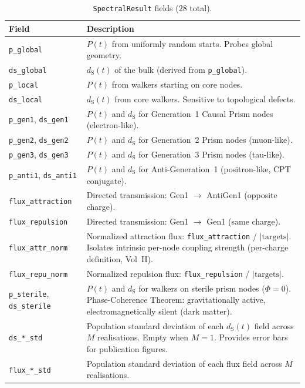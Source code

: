 \documentclass[11pt, a4paper, openany]{book}
\newcommand{\dS}{d_{\mathrm{S}}}
\newcommand{\code}[1]{\texttt{#1}}
\begin{document}
\begin{table}[H]
\centering
\begin{tabular}{@{} l p{9cm} @{}}
\toprule
\textbf{Field} & \textbf{Description} \\
\midrule
\code{p\_global}         & $P(t)$ from uniformly random starts. Probes global geometry. \\
\code{ds\_global}        & $\dS(t)$ of the bulk (derived from \code{p\_global}). \\
\code{p\_local}          & $P(t)$ from walkers starting on core nodes. \\
\code{ds\_local}         & $\dS(t)$ from core walkers. Sensitive to topological defects. \\
\code{p\_gen1}, \code{ds\_gen1}   & $P(t)$ and $\dS$ for Generation~1 Causal Prism nodes (electron-like). \\
\code{p\_gen2}, \code{ds\_gen2}   & $P(t)$ and $\dS$ for Generation~2 Prism nodes (muon-like). \\
\code{p\_gen3}, \code{ds\_gen3}   & $P(t)$ and $\dS$ for Generation~3 Prism nodes (tau-like). \\
\code{p\_anti1}, \code{ds\_anti1} & $P(t)$ and $\dS$ for Anti-Generation~1 (positron-like, CPT conjugate). \\
\code{flux\_attraction}  & Directed transmission: Gen1 $\to$ AntiGen1 (opposite charge). \\
\code{flux\_repulsion}   & Directed transmission: Gen1 $\to$ Gen1 (same charge). \\
\code{flux\_attr\_norm}  & Normalized attraction flux: \code{flux\_attraction} / $|\text{targets}|$. Isolates intrinsic per-node coupling strength (per-charge definition, Vol~II). \\
\code{flux\_repu\_norm}  & Normalized repulsion flux: \code{flux\_repulsion} / $|\text{targets}|$. \\
\code{p\_sterile}, \code{ds\_sterile} & $P(t)$ and $\dS$ for walkers on sterile prism nodes ($\Phi = 0$). Phase-Coherence Theorem: gravitationally active, electromagnetically silent (dark matter). \\
\code{ds\_*\_std}        & Population standard deviation of each $\dS(t)$ field across $M$ realisations. Empty when $M = 1$. Provides error bars for publication figures. \\
\code{flux\_*\_std}      & Population standard deviation of each flux field across $M$ realisations. \\
\bottomrule
\end{tabular}
\caption{\code{SpectralResult} fields (28 total).}
\end{table}
\end{document}
